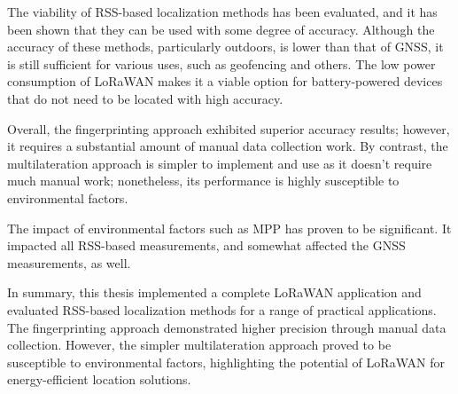 The viability of \ac{RSS}-based localization methods has been evaluated, and it has been shown that they can be used with some degree of accuracy.
Although the accuracy of these methods, particularly outdoors, is lower than that of \ac{GNSS}, it is still sufficient for various uses, such as geofencing and others.
The low power consumption of \ac{LoRaWAN} makes it a viable option for battery-powered devices that do not need to be located with high accuracy.

Overall, the fingerprinting approach exhibited superior accuracy results; however, it requires a substantial amount of manual data collection work.
By contrast, the multilateration approach is simpler to implement and use as it doesn't require much manual work; nonetheless, its performance is highly susceptible to environmental factors.

The impact of environmental factors such as \ac{MPP} has proven to be significant.
It impacted all \ac{RSS}-based measurements, and somewhat affected the \ac{GNSS} measurements, as well.

In summary, this thesis implemented a complete \ac{LoRaWAN} application and evaluated \ac{RSS}-based localization methods for a range of practical applications.
The fingerprinting approach demonstrated higher precision through manual data collection.
However, the simpler multilateration approach proved to be susceptible to environmental factors, highlighting the potential of \ac{LoRaWAN} for energy-efficient location solutions.